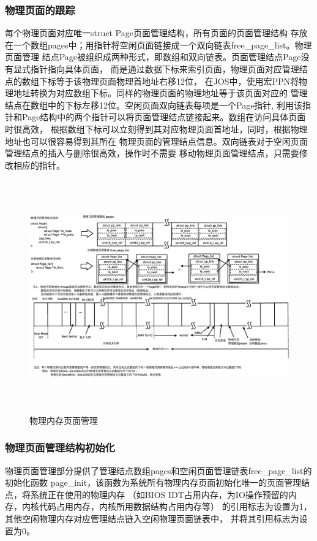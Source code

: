\documentclass[12pt,openany,a4paper]{report}
\begin{document}
	    \subsubsection{物理页面的跟踪}
	每个物理页面对应唯一struct Page页面管理结构，所有页面的页面管理结构
	存放在一个数组pages中；用指针将空闲页面链接成一个双向链表free\_page\_list。物理页面管理
	结点Page被组织成两种形式，即数组和双向链表。页面管理结点Page没有显式指针指向具体页面，
	而是通过数据下标来索引页面，物理页面对应管理结点的数组下标等于该物理页面物理首地址右移12位，
	在JOS中，使用宏PPN将物理地址转换为对应数组下标。同样的物理页面的物理地址等于该页面对应的
	管理结点在数组中的下标左移12位。空闲页面双向链表每项是一个Page指针,
	利用该指针和Page结构中的两个指针可以将页面管理结点链接起来。数组在访问具体页面时很高效，
	根据数组下标可以立刻得到其对应物理页面首地址，同时，根据物理地址也可以很容易得到其所在
	物理页面的管理结点信息。双向链表对于空闲页面管理结点的插入与删除很高效，操作时不需要
	移动物理页面管理结点，只需要修改相应的指针。\par
	
	\begin{figure}[htb]
		\centering
		\includegraphics[height=10cm]{pages.eps}
		\caption[物理内存页面管理]{物理内存页面管理}
	\end{figure}

	    	\subsubsection{物理页面管理结构初始化}
	    物理页面管理部分提供了管理结点数组pages和空闲页面管理链表free\_page\_list的初始化函数
	page\_init，该函数为系统所有物理内存页面初始化唯一的页面管理结点，将系统正在使用的物理内存
	（如BIOS IDT占用内存，为IO操作预留的内存，内核代码占用内存，内核所用数据结构占用内存等）
	的引用标志为设置为1，其他空闲物理内存对应管理结点链入空闲物理页面链表中，
	并将其引用标志为设置为0。\par
\end{document}
